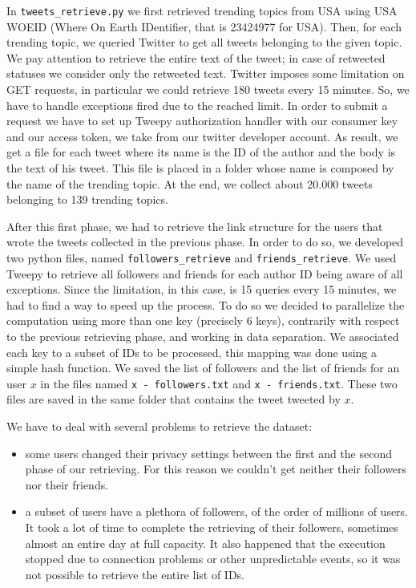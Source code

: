 \documentclass[journal,11pt]{vgtc}
\begin{document}
In \texttt{tweets\_retrieve.py} we
first retrieved trending topics from USA using USA WOEID (Where On Earth IDentifier, that is 23424977 for USA). 
Then, for each trending topic, we queried Twitter to get all tweets belonging to the given topic.
We pay attention to retrieve the entire text of the tweet; in case of retweeted statuses we consider only the 
retweeted text. 
Twitter imposes some limitation on GET requests, in particular we could retrieve 180 tweets every 15 minutes.
So, we have to handle exceptions fired due to the reached limit.
In order to submit a request we have to set up Tweepy authorization handler with our
consumer key and our access token, we take from our twitter developer account.
As result, we get a file for each tweet where its name is the ID of the author and the body is the text of his tweet.
This file is placed in a folder whose name is composed by the name of the trending topic.
At the end, we collect about 20.000 tweets belonging to 139 trending topics.

After this first phase, we had to retrieve the link structure for the users that wrote the tweets collected 
in the previous phase. In order to do so, we developed two python files, named \texttt{followers\_retrieve} and 
\texttt{friends\_retrieve}. 
We used Tweepy to retrieve all followers and friends for each author ID being aware of all exceptions.
Since the limitation, in this case, is 15 queries every 15 minutes, we had to find a way to speed up the process.
To do so we decided to parallelize the computation using more than one key (precisely 6 keys), contrarily with respect to the previous 
retrieving phase, and working in data separation. We associated each key to a subset of IDs to be processed, this
mapping was done using a simple hash function. 
We saved the list of followers and the list of friends for an user $x$ in the files named \texttt{x - followers.txt}
and \texttt{x - friends.txt}. These two files are saved in the same folder that contains the tweet tweeted by $x$.

We have to deal with several problems to retrieve the dataset:
\begin{itemize}
  \item some users changed their privacy settings between the first and the second phase
  of our retrieving. For this reason we couldn't get neither their followers nor their friends.
  \item a subset of users have a plethora of followers, of the order of millions of users. 
  It took a lot of time to complete the retrieving of their followers, sometimes almost an 
  entire day at full capacity.
  It also happened that the execution stopped due to connection problems or other unpredictable events, 
  so it was not possible to retrieve the entire list of IDs.
  
\end{itemize}




\end{document}
